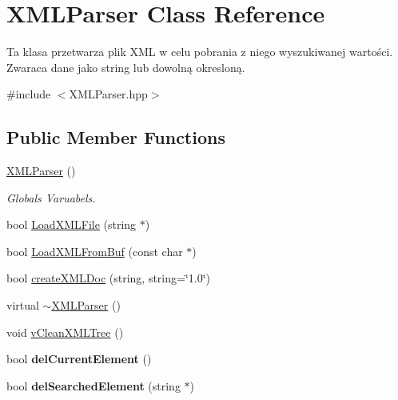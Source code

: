 \hypertarget{classXMLParser}{
\section{XMLParser Class Reference}
\label{classXMLParser}
}


Ta klasa przetwarza plik XML w celu pobrania z niego wyszukiwanej wartości. Zwaraca dane jako string lub dowolną okresloną.  




{\ttfamily \#include $<$XMLParser.hpp$>$}

\subsection*{Public Member Functions}
\begin{DoxyCompactItemize}
\item 
\hypertarget{classXMLParser_a60004d4b50ef242bbd191a494fd750f1}{
\hyperlink{classXMLParser_a60004d4b50ef242bbd191a494fd750f1}{XMLParser} ()}
\label{classXMLParser_a60004d4b50ef242bbd191a494fd750f1}

\begin{DoxyCompactList}\small\item\em Globals Varuabels. \item\end{DoxyCompactList}\item 
bool \hyperlink{classXMLParser_a995bf6dfb911fab6db31ffb0d7d12b96}{LoadXMLFile} (string $\ast$)
\item 
bool \hyperlink{classXMLParser_a3d960023705bd1d8ef357bda9efdf73a}{LoadXMLFromBuf} (const char $\ast$)
\item 
bool \hyperlink{classXMLParser_a73350cfff1a1dc52d8250df480f2b796}{createXMLDoc} (string, string=\char`\"{}1.0\char`\"{})
\item 
virtual \hyperlink{classXMLParser_af833ecdb0e07ead08dfda925b4af86ad}{$\sim$XMLParser} ()
\item 
void \hyperlink{classXMLParser_ac4725bcded634f7acdbc3cb9608d8d09}{vCleanXMLTree} ()
\item 
\hypertarget{classXMLParser_a188c0c6172df9b6e0f12afbe32ff6de3}{
bool {\bfseries delCurrentElement} ()}
\label{classXMLParser_a188c0c6172df9b6e0f12afbe32ff6de3}

\item 
\hypertarget{classXMLParser_a50cab9ef3bb1612d710055c93b89d325}{
bool {\bfseries delSearchedElement} (string $\ast$)}
\label{classXMLParser_a50cab9ef3bb1612d710055c93b89d325}


\end{DoxyCompactItemize}
